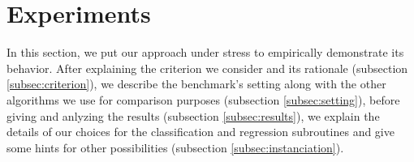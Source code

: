 \documentclass[smallextended]{svjour3}
\begin{document}


\section{Experiments}
\label{sec:experiments}
In this section, we put our approach under stress to empirically demonstrate its behavior. After explaining the criterion we consider and its rationale (subsection \ref{subsec:criterion}), we describe the benchmark's setting along with the other algorithms we use for comparison purposes (subsection \ref{subsec:setting}), before giving and anlyzing the results (subsection \ref{subsec:results}), we explain the details of our choices for the classification and regression subroutines and give some hints for other possibilities (subsection \ref{subsec:instanciation}).
\end{document}

